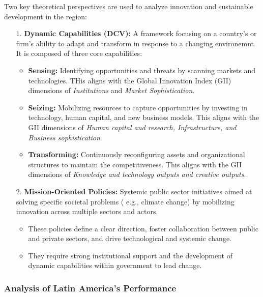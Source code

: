 \documentclass{article}
\begin{document}
    \noindent Two key theoretical perspectives are used to analyze
innovation and sustainable development in the region:
    \begin{itemize}
        \item [$1$.] \textbf{Dynamic Capabilities (DCV):} A framework
        focusing on a
        country's or firm's ability to adapt and transform in response to a
        changing environemnt. It is composed of three core capabilities:
        \begin{itemize}
            \item \textbf{Sensing:} Identifying opportunities and threats by
            scanning markets and technologies. THis aligns with the Global
            Innovation Index (GII) dimensions of \textit{Institutions} and \textit{Market Sophistication}.
            \item \textbf{Seizing:} Mobilizing resources to capture
            opportunities by investing in technology, human capital, and new
            business models. This aligns with the GII dimensions of
            \textit{Human capital and research, Infrastructure, and Business sophistication}.
            \item \textbf{Transforming:} Continuously reconfiguring assets
            and organizational structures to maintain the competitiveness.
            This aligns with the GII dimensions of
            \textit{Knowledge and technology outputs and creative outputs}.
        \end{itemize}
        \item[$2$.] \textbf{Mission-Oriented Policies:} Systemic public
        sector initiatives aimed at solving specific societal problems (
        e.g., climate change) by mobilizing innovation across multiple
        sectors and actors.
        \begin{itemize}
            \item These policies define a clear direction, foster
            collaboration between public and private sectors, and drive
            technological and systemic change.
            \item They require strong institutional support and the
            development of dynamic capabilities within government to lead
            change.
        \end{itemize}
    \end{itemize}

    \subsubsection{Analysis of Latin America's Performance}
\end{document}
